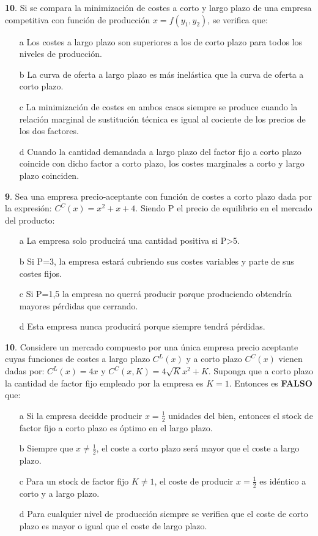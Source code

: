 \documentclass{nuevotema}
\begin{document}

\textbf{10}. Si se compara la minimización de costes a corto y largo plazo de una empresa competitiva con función de producción $x=f(y_1, y_2)$, se verifica que: 

\begin{enumerate}
	\item[a] Los costes a largo plazo son superiores a los de corto plazo para todos los niveles de producción.
	\item[b] La curva de oferta a largo plazo es más inelástica que la curva de oferta a corto plazo.
	\item[c] La minimización de costes en ambos casos siempre se produce cuando la relación marginal de sustitución técnica es igual al cociente de los precios de los dos factores.
	\item[d] Cuando la cantidad demandada a largo plazo del factor fijo a corto plazo coincide con dicho factor a corto plazo, los costes marginales a corto y largo plazo coinciden.
\end{enumerate}


\textbf{9}. Sea una empresa precio-aceptante con función de costes a corto plazo dada por la expresión: $C^C(x) = x^2 +x+4$. Siendo P el precio de equilibrio en el mercado del producto:

\begin{enumerate}
	\item[a] La empresa solo producirá una cantidad positiva si P>5.
	\item[b] Si P=3, la empresa estará cubriendo sus costes variables y parte de sus costes fijos.
	\item[c] Si P=1,5 la empresa no querrá producir porque produciendo obtendría mayores pérdidas que cerrando.
	\item[d] Esta empresa nunca producirá porque siempre tendrá pérdidas.
\end{enumerate}

\textbf{10}. Considere un mercado compuesto por una única empresa precio aceptante cuyas funciones de costes a largo plazo $C^L(x)$ y a corto plazo $C^C(x)$ vienen dadas por: $C^L(x) = 4x$ y $C^C(x,K)=4\sqrt{K}x^2 + K$. Suponga que a corto plazo la cantidad de factor fijo empleado por la empresa es $K=1$. Entonces es \textbf{FALSO} que:

\begin{enumerate}
	\item[a] Si la empresa decidde producir $x=\frac{1}{2}$ unidades del bien, entonces el stock de factor fijo a corto plazo es óptimo en el largo plazo.
	\item[b] Siempre que $x \neq \frac{1}{2}$, el coste a corto plazo será mayor que el coste a largo plazo.
	\item[c] Para un stock de factor fijo $K \neq 1$, el coste de producir $x=\frac{1}{2}$ es idéntico a corto y a largo plazo.
	\item[d] Para cualquier nivel de producción siempre se verifica que el coste de corto plazo es mayor o igual que el coste de largo plazo.
\end{enumerate}
\end{document}
